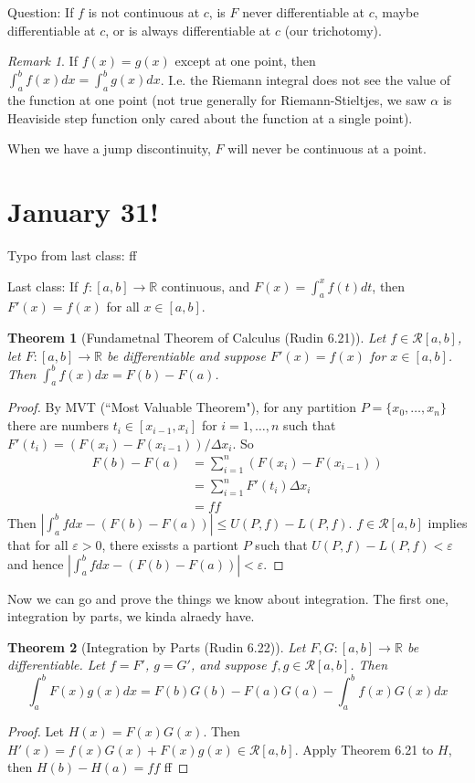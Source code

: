 \documentclass{article}
\theoremstyle{plain}
\newtheorem{theorem}{Theorem}
\theoremstyle{remark}
\newtheorem{remark}{Remark}
\newcommand{\R}{{\mathbb R}}
\newcommand{\ep}{{\varepsilon}}
\begin{document}
Question: If $f$ is not continuous at $c$,
is $F$ never differentiable at $c$, maybe differentiable at $c$,
or is always differentiable at $c$ (our trichotomy).
\begin{remark}
	If $f(x) = g(x)$ except at one point,
	then $\int_a^b f(x) dx = \int_a^b g(x) dx$.
	I.e. the Riemann integral does not see the value of the function
	at one point (not true generally for Riemann-Stieltjes,
	we saw $\alpha$ is Heaviside step function only cared about
	the function at a single point).
\end{remark}
When we have a jump discontinuity, $F$ will never be continuous at a point.

\section{January 31!}
Typo from last class:
ff

Last class: If $f \colon [a,b] \to \R$ continuous,
and $F(x) = \int_a^x f(t) dt$, then $F'(x) = f(x)$ for all $x \in [a,b]$.

\begin{theorem}[Fundametnal Theorem of Calculus (Rudin 6.21)]
	Let $f \in \mathcal{R}[a,b]$, let $F \colon [a,b] \to \R$ be differentiable
	and suppose $F'(x) = f(x)$ for $x \in [a,b]$.
	Then $\int_a^b f(x)dx = F(b) - F(a)$.
\end{theorem}

\begin{proof}
	By MVT (``Most Valuable Theorem"),
	for any partition $P = \{x_0, \dots, x_n\}$ there are numbers
$t_i \in [x_{i-1},x_i]$ for $i = 1,\dots,n$ such that
$F'(t_i) = (F(x_i) - F(x_{i-1}))/\Delta x_i$. So
	\begin{align*}
		F(b) - F(a)
		&= \sum_{i=1}^n (F(x_i) - F(x_{i-1}))\\
		&= \sum_{i=1}^n F'(t_i)\Delta x_i\\
		&= ff
	\end{align*}
	Then $\left\lvert \int_a^b fdx - (F(b) - F(a)) \right\rvert
	\leq U(P,f) - L(P,f)$.
	$f \in \mathcal{R}[a,b]$ implies that for all $\ep > 0$,
	there exissts a partiont $P$ such that $U(P,f) - L(P,f) < \ep$
	and hence $\left\lvert \int_a^b fdx - (F(b) - F(a)) \right\rvert< \ep$.
\end{proof}

Now we can go and prove the things we know about integration.
The first one, integration by parts, we kinda alraedy have.

\begin{theorem}[Integration by Parts (Rudin 6.22)]
	Let $F,G \colon [a,b] \to \R$ be differentiable.
	Let $f = F'$, $g = G'$, and suppose $f,g \in \mathcal{R}[a,b]$.
	Then
	\[
		\int_a^b F(x)g(x)dx = F(b)G(b) - F(a)G(a) - \int_a^bf(x)G(x)dx
	\]
\end{theorem}
\begin{proof}
	Let $H(x) = F(x)G(x)$. Then $H'(x) = f(x)G(x) + F(x)g(x) \in \mathcal{R}[a,b]$.
	Apply Theorem 6.21 to $H$, then $H(b) - H(a) = ff$
	ff
\end{proof}
\end{document}
